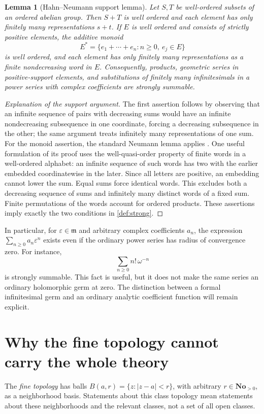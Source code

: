 \documentclass[11pt,letterpaper]{article}
\newtheorem{lemma}[theorem]{Lemma}
\theoremstyle{definition}
\theoremstyle{remark}
\newcommand{\No}{\mathbf{No}}
\newcommand{\mm}{\mathfrak m}
\numberwithin{equation}{section}
\begin{document}
\begin{lemma}[Hahn--Neumann support lemma]\label{lem:neumann}
Let $S,T$ be well-ordered subsets of an ordered abelian group. Then $S+T$ is well ordered and each element has only finitely many representations $s+t$. If $E$ is well ordered and consists of strictly positive elements, the additive monoid
\[
 E^*=\{e_1+\cdots+e_n:n\ge0,\ e_j\in E\}
\]
is well ordered, and each element has only finitely many representations as a finite nondecreasing word in $E$. Consequently, products, geometric series in positive-support elements, and substitutions of finitely many infinitesimals in a power series with complex coefficients are strongly summable.
\end{lemma}
\begin{proof}[Explanation of the support argument]
The first assertion follows by observing that an infinite sequence of pairs with decreasing sums would have an infinite nondecreasing subsequence in one coordinate, forcing a decreasing subsequence in the other; the same argument treats infinitely many representations of one sum. For the monoid assertion, the standard Neumann lemma applies \cite{Neumann,Poonen}. One useful formulation of its proof uses the well-quasi-order property of finite words in a well-ordered alphabet: an infinite sequence of such words has two with the earlier embedded coordinatewise in the later. Since all letters are positive, an embedding cannot lower the sum. Equal sums force identical words. This excludes both a decreasing sequence of sums and infinitely many distinct words of a fixed sum. Finite permutations of the words account for ordered products. These assertions imply exactly the two conditions in \cref{def:strong}.
\end{proof}
In particular, for $\varepsilon\in\mm$ and arbitrary complex coefficients $a_n$, the expression $\sum_{n\ge0}a_n\varepsilon^n$ exists even if the ordinary power series has radius of convergence zero. For instance,
\begin{equation}\label{eq:factorialseries}
 \sum_{n\ge0}n!\,\omega^{-n}
\end{equation}
is strongly summable. This fact is useful, but it does not make the same series an ordinary holomorphic germ at zero. The distinction between a formal infinitesimal germ and an ordinary analytic coefficient function will remain explicit.

\section{Why the fine topology cannot carry the whole theory}\label{sec:topology}
The \emph{fine topology} has balls $B(a,r)=\{z:|z-a|<r\}$, with arbitrary $r\in\No_{>0}$, as a neighborhood basis. Statements about this class topology mean statements about these neighborhoods and the relevant classes, not a set of all open classes.
\end{document}
